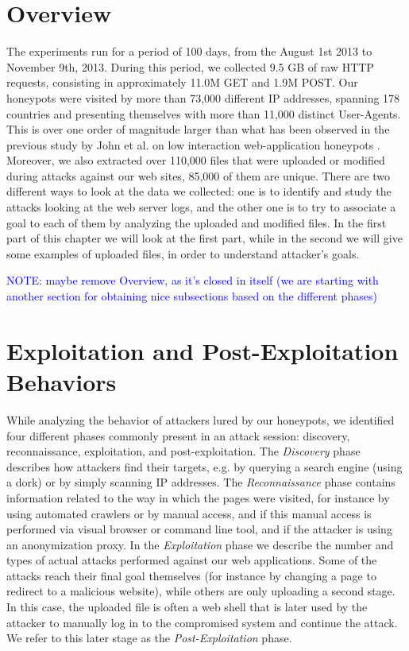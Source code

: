 \section{Overview}

The experiments run for a period of 100 days, from the August 1st 2013 to November 9th, 2013. During this period, we collected 9.5 GB of raw HTTP requests, consisting in approximately 11.0M GET and 1.9M POST. Our honeypots were visited by more than 73,000 different IP addresses, spanning 178 countries and presenting themselves with more than 11,000 distinct User-Agents. This is over one order of magnitude larger than what has been observed in the previous study by John et al. on low interaction web-application honeypots \cite{johnhsh}. Moreover, we also extracted over 110,000 files that were uploaded or modified during attacks against our web sites, 85,000 of them are unique.
There are two different ways to look at the data we collected: one is to identify and study the attacks looking at the web server logs, and the other one is to try to associate a goal to each of them by analyzing the uploaded and modified files. In the first part of this chapter we will look at the first part, while in the second we will give some examples of uploaded files, in order to understand attacker's goals.

\textcolor{blue}{NOTE: maybe remove Overview, as it's closed in itself (we are starting with another section for obtaining nice subsections based on the different phases)}

\section{Exploitation and Post-Exploitation Behaviors}

While analyzing the behavior of attackers lured by our honeypots, we identified four different phases commonly present in an attack session: discovery, reconnaissance, exploitation, and post-exploitation. The \emph{Discovery} phase describes how attackers find their targets, e.g. by querying a search engine (using a dork) or by simply scanning IP addresses. The \emph{Reconnaissance} phase contains information related to the way in which the pages were visited, for instance by using automated crawlers or by manual access, and if this manual access is performed via visual browser or command line tool, and if the attacker is using an anonymization proxy. In the \emph{Exploitation} phase we describe the number and types of actual attacks performed against our web applications. Some of the attacks reach their final goal themselves (for instance by changing a page to redirect to a malicious website), while others are only uploading a second stage. In this case, the uploaded file is often a web shell that is later used by the attacker to manually log in to the compromised system and continue the attack. We refer to this later stage as the \emph{Post-Exploitation} phase.

